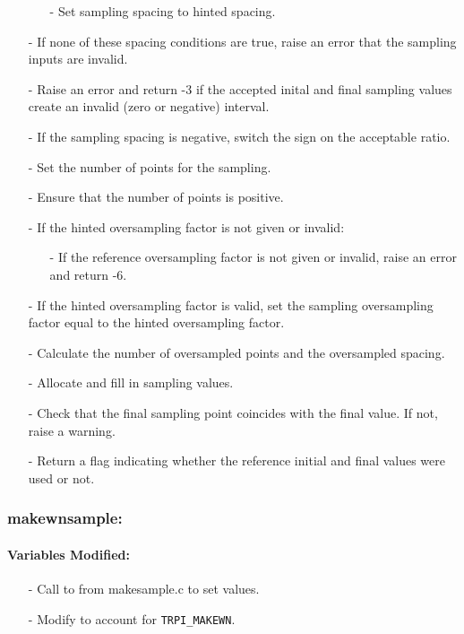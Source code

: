 \documentclass[letterpaper,12pt]{article}
\begin{document}
\begin{enumerate}[leftmargin=10pt, noitemsep, parsep=0pt, topsep=0ex]
\begin{enumerate}[leftmargin=10pt, noitemsep, parsep=0pt, topsep=0ex]
\item[]- Set sampling spacing to hinted spacing.
\end{enumerate}
\item[-] If none of these spacing conditions are true, raise an error that the sampling inputs are invalid.
\item[-] Raise an error and return -3 if the accepted inital and final sampling values create an invalid (zero or negative) interval.
\item[-] If the sampling spacing is negative, switch the sign on the acceptable ratio.
\item[-] Set the number of points for the sampling.
\item[-] Ensure that the number of points is positive.
\item[-] If the hinted oversampling factor is not given or invalid:
\begin{enumerate}[leftmargin=10pt, noitemsep, parsep=0pt, topsep=0ex]
\item[-] If the reference oversampling factor is not given or invalid, raise an error and return -6.
\end{enumerate}
\item[-] If the hinted oversampling factor is valid, set the sampling oversampling factor equal to the hinted oversampling factor.
\item[-] Calculate the number of oversampled points and the oversampled spacing.
\item[-] Allocate and fill in sampling values.
\item[-] Check that the final sampling point coincides with the final value. If not, raise a warning.
\item[-] Return a flag indicating whether the reference initial and final values were used or not.
\end{enumerate}

\subsubsection{makewnsample:}
\paragraph{Variables Modified:}
\begin{enumerate}[leftmargin=10pt, noitemsep, parsep=0pt, topsep=0ex]
\item[-] Call to  from makesample.c to set  values.
\item[-] Modify  to account for {\tt TRPI\_MAKEWN}.
\end{enumerate}
\end{document}
